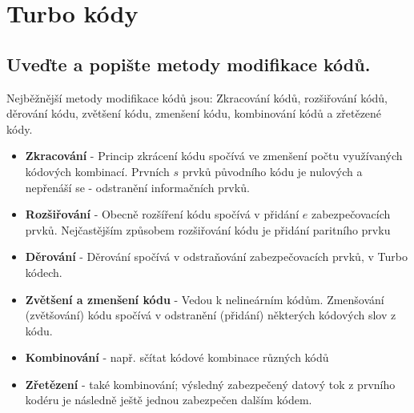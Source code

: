 \clearpage
\section{Turbo kódy}
\subsection{Uveďte a popište metody modifikace kódů.}
Nejběžnější metody modifikace kódů jsou: Zkracování kódů, rozšiřování kódů, děrování kódu, zvětšení kódu, zmenšení kódu, kombinování kódů a zřetězené kódy.
\begin{itemize}
    \item \textbf{Zkracování} - Princip zkrácení kódu spočívá ve zmenšení počtu využívaných kódových kombinací. Prvních $s$ prvků původního kódu je nulových a nepřenáší se - odstranění informačních prvků.
    \item \textbf{Rozšiřování} - Obecně rozšíření kódu spočívá v přidání $e$ zabezpečovacích prvků. Nejčastějším způsobem rozšiřování kódu je přidání paritního prvku
    \item \textbf{Děrování} - Děrování spočívá v odstraňování zabezpečovacích prvků, v Turbo kódech.
    \item \textbf{Zvětšení a zmenšení kódu} -  Vedou k nelineárním kódům. Zmenšování (zvětšování) kódu spočívá v odstranění (přidání) některých kódových slov z kódu.
    \item \textbf{Kombinování} - např. sčítat kódové kombinace různých kódů
    \item \textbf{Zřetězení} - také kombinování; výsledný zabezpečený datový tok z prvního kodéru je následně ještě jednou zabezpečen dalším kódem.
\end{itemize}

